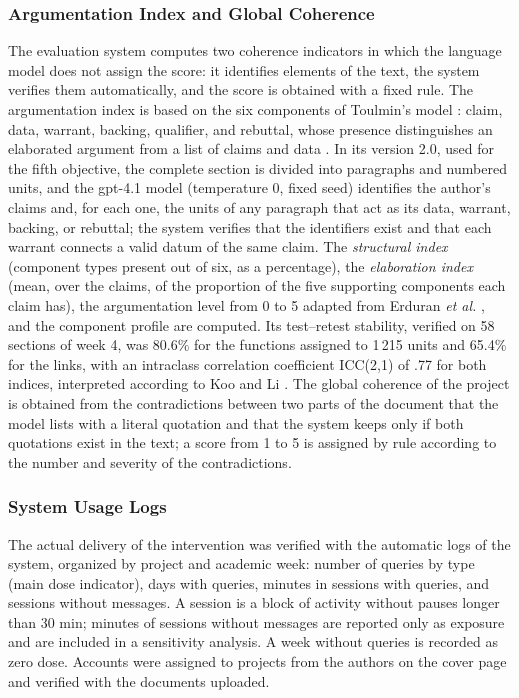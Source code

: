 \documentclass[journal]{IEEEtran}
\begin{document}
\subsubsection{Argumentation Index and Global Coherence}
The evaluation system computes two coherence indicators in which the language model does not assign the score: it identifies elements of the text, the system verifies them automatically, and the score is obtained with a fixed rule. The argumentation index is based on the six components of Toulmin's model \cite{toulmin2003}: claim, data, warrant, backing, qualifier, and rebuttal, whose presence distinguishes an elaborated argument from a list of claims and data \cite{erduran2004,qin2010}. In its version 2.0, used for the fifth objective, the complete section is divided into paragraphs and numbered units, and the gpt-4.1 model (temperature 0, fixed seed) identifies the author's claims and, for each one, the units of any paragraph that act as its data, warrant, backing, or rebuttal; the system verifies that the identifiers exist and that each warrant connects a valid datum of the same claim. The \emph{structural index} (component types present out of six, as a percentage), the \emph{elaboration index} (mean, over the claims, of the proportion of the five supporting components each claim has), the argumentation level from 0 to 5 adapted from Erduran \emph{et al.} \cite{erduran2004}, and the component profile are computed. Its test--retest stability, verified on 58 sections of week 4, was 80.6\% for the functions assigned to 1\,215 units and 65.4\% for the links, with an intraclass correlation coefficient ICC(2,1) of .77 for both indices, interpreted according to Koo and Li \cite{koo2016}. The global coherence of the project is obtained from the contradictions between two parts of the document that the model lists with a literal quotation and that the system keeps only if both quotations exist in the text; a score from 1 to 5 is assigned by rule according to the number and severity of the contradictions.

\subsubsection{System Usage Logs}
The actual delivery of the intervention was verified with the automatic logs of the system, organized by project and academic week: number of queries by type (main dose indicator), days with queries, minutes in sessions with queries, and sessions without messages. A session is a block of activity without pauses longer than 30 min; minutes of sessions without messages are reported only as exposure and are included in a sensitivity analysis. A week without queries is recorded as zero dose. Accounts were assigned to projects from the authors on the cover page and verified with the documents uploaded.
\end{document}
